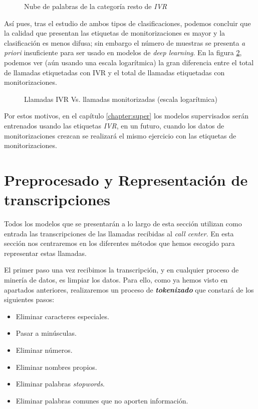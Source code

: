 \begin{figure}[!ht]
	\centering
    \caption{Nube de palabras de la categoría resto de \textit{IVR}}
    \label{fig:cloudivr_resto}
\end{figure} 
\FloatBarrier

Así pues, tras el estudio de ambos tipos de clasificaciones, podemos concluir que la calidad que presentan las etiquetas de monitorizaciones es mayor y la clasificación es menos difusa; sin embargo el número de muestras se presenta \textit{a priori} insuficiente para ser usado en modelos de \textit{deep learning}. En la figura \ref{fig:ivrvsmoni}, podemos ver (aún usando una escala logarítmica) la gran diferencia entre el total de llamadas etiquetadas con IVR y el total de llamadas etiquetadas con monitorizaciones.

\begin{figure}[!ht]
	\centering
    \caption{Llamadas IVR Vs. llamadas monitorizadas (escala logarítmica)}
    \label{fig:ivrvsmoni}
\end{figure} 




Por estos motivos, en el capítulo \ref{chapter:super} los modelos supervisados serán entrenados usando las etiquetas \textit{IVR}, en un futuro, cuando los datos de monitorizaciones crezcan se realizará el mismo ejercicio con las etiquetas de monitorizaciones. 


\section{Preprocesado y Representación de transcripciones}
\label{section:data:repr}



Todos los modelos que se presentarán a lo largo de esta sección utilizan como entrada las transcripciones de las llamadas recibidas al \textit{call center}. En esta sección nos centraremos en los diferentes métodos que hemos escogido para representar estas llamadas.


El primer paso una vez recibimos la transcripción, y en cualquier proceso de minería de datos, es limpiar los datos. Para ello, como ya hemos visto en apartados anteriores, realizaremos un proceso de \textit{\textbf{tokenizado}} que constará de los siguientes pasos: 

\begin{itemize}
\item Eliminar caracteres especiales. 
\item Pasar a minúsculas. 
\item Eliminar números. 
\item Eliminar nombres propios. 
\item Eliminar palabras \textit{stopwords}. 
\item Eliminar palabras comunes que no aporten información.
\end{itemize}

